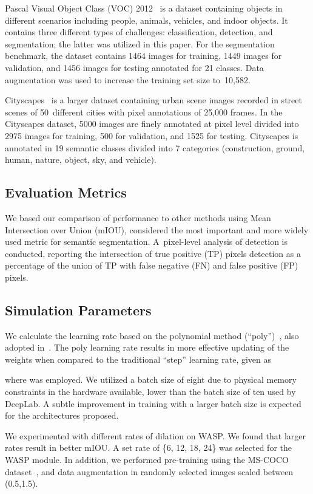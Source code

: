 \documentclass[sensors,article,accept,moreauthors,pdftex]{Definitions/mdpi}
\begin{document}
Pascal Visual Object Class (VOC) 2012~\cite{Pascal} is a dataset containing objects in different scenarios including people, animals, vehicles, and indoor objects. It contains three different types of challenges: classification, detection, and segmentation; the latter was utilized in this paper. For the segmentation benchmark, the dataset contains 1464 images for training, 1449 images for validation, and 1456 images for testing annotated for 21 classes. Data augmentation was used to increase the training set size to~10,582.

Cityscapes~\cite{Cityscapes} is a larger dataset containing urban scene images recorded in street scenes of 50~different cities with pixel annotations of 25,000 frames.
In the Cityscapes dataset, 5000 images are finely annotated at pixel level divided into 2975 images for training, 500 for validation, and 1525 for testing. Cityscapes is annotated in 19 semantic classes divided into 7 categories (construction, ground, human, nature, object, sky, and vehicle).

\subsection{Evaluation Metrics}
We based our comparison of performance to other methods using Mean Intersection over Union (mIOU), considered the most important and more widely used metric for semantic segmentation. A~pixel-level analysis of detection is conducted, reporting the intersection of true positive (TP) pixels detection as a percentage of the union of TP with false negative (FN) and false positive (FP) pixels.

\subsection{Simulation Parameters}
We calculate the learning rate based on the polynomial method (``poly'')~\cite{Parsenet}, also adopted in~\cite{DeepLab}. The poly learning rate  results in more effective updating of the weights when compared to the traditional ``step'' learning rate, given as

where  was employed.
We utilized a batch size of eight due to physical memory constraints in the hardware available, lower than the batch size of ten used by DeepLab. A subtle improvement in training with a larger batch size is expected for the architectures proposed.

We experimented with different rates of dilation on WASP. We found that larger rates result in better mIOU. A set rate of  \{6, 12, 18, 24\} was selected for the WASP module. In addition, we performed pre-training using the MS-COCO dataset~\cite{COCO}, and data augmentation in randomly selected images scaled between (0.5,1.5).
\end{document}
